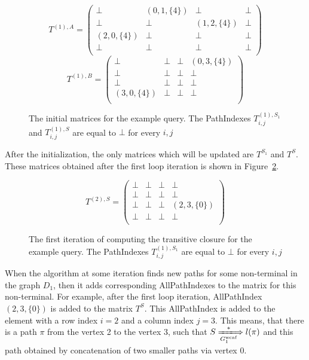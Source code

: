 {\footnotesize
	\begin{figure}[h]
		\[
		T^{(1),A} = \begin{pmatrix}
			\bot & (0,1,\{4\})       & \bot & \bot       \\
			\bot & \bot & (1,2,\{4\})       & \bot \\
			(2,0,\{4\})       & \bot & \bot & \bot \\
			\bot       & \bot & \bot & \bot \\
		\end{pmatrix}
		\]
		\[
		T^{(1),B} = \begin{pmatrix}
			\bot & \bot       & \bot & (0,3,\{4\})       \\
			\bot & \bot & \bot       & \bot \\
			\bot       & \bot & \bot & \bot \\
			(3,0,\{4\})      & \bot & \bot & \bot \\
		\end{pmatrix}
		\]
		\caption{The initial matrices for the example query. The PathIndexes $T^{(1),S_1}_{i,j}$ and $T^{(1),S}_{i,j}$ are equal to $\bot$ for every $i,j$}
		\label{ExampleQueryInitMatrix}
	\end{figure}
}

After the initialization, the only matrices which will be updated are $T^{S_1}$ and $T^{S}$. These matrices obtained after the first loop iteration is shown in Figure~\ref{ExampleQueryFirstIteration}.

{\footnotesize
	\begin{figure}[h]
		\[
		T^{(2),S} = \begin{pmatrix}
			\bot & \bot       & \bot & \bot       \\
			\bot & \bot & \bot       & \bot \\
			\bot       & \bot & \bot & (2,3,\{0\}) \\
			\bot       & \bot & \bot & \bot \\
		\end{pmatrix}
		\]
		\caption{The first iteration of computing the transitive closure for the example query. The PathIndexes $T^{(1),S_1}_{i,j}$ are equal to $\bot$ for every $i,j$}
		\label{ExampleQueryFirstIteration}
	\end{figure}
}

When the algorithm at some iteration finds new paths for some non-terminal in the graph $D_1$, then it adds corresponding AllPathIndexes to the matrix for this non-terminal. For example, after the first loop iteration, AllPathIndex $(2,3,\{0\})$ is added to the matrix $T^{S}$. This AllPathIndex is added to the element with a row index $i = 2$ and a column index $j = 3$. This means, that there is a path $\pi$ from the vertex 2 to the vertex 3, such that $S \xLongrightarrow[G_1^{\text{wcnf}}]{*} l(\pi)$ and this path obtained by concatenation of two smaller paths via vertex 0.


